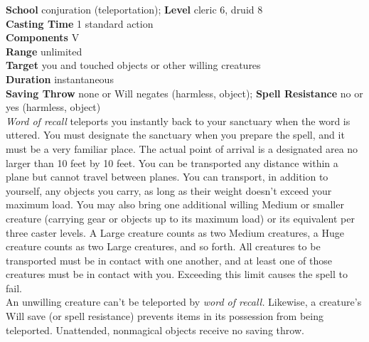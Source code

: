 \textbf{School} conjuration (teleportation); \textbf{Level} cleric 6, druid 8\\
\textbf{Casting Time} 1 standard action\\
\textbf{Components} V\\
\textbf{Range} unlimited\\
\textbf{Target} you and touched objects or other willing creatures\\
\textbf{Duration} instantaneous\\
\textbf{Saving Throw} none or Will negates (harmless, object); \textbf{Spell Resistance} no or yes (harmless, object)\\
\textit{Word of recall }teleports you instantly back to your sanctuary when the word is uttered. You must designate the sanctuary when you prepare the spell, and it must be a very familiar place. The actual point of arrival is a designated area no larger than 10 feet by 10 feet. You can be transported any distance within a plane but cannot travel between planes. You can transport, in addition to yourself, any objects you carry, as long as their weight doesn't exceed your maximum load. You may also bring one additional willing Medium or smaller creature (carrying gear or objects up to its maximum load) or its equivalent per three caster levels. A Large creature counts as two Medium creatures, a Huge creature counts as two Large creatures, and so forth. All creatures to be transported must be in contact with one another, and at least one of those creatures must be in contact with you. Exceeding this limit causes the spell to fail.\\
An unwilling creature can't be teleported by \textit{word of recall. }Likewise, a creature's Will save (or spell resistance) prevents items in its possession from being teleported. Unattended, nonmagical objects receive no saving throw.\\
